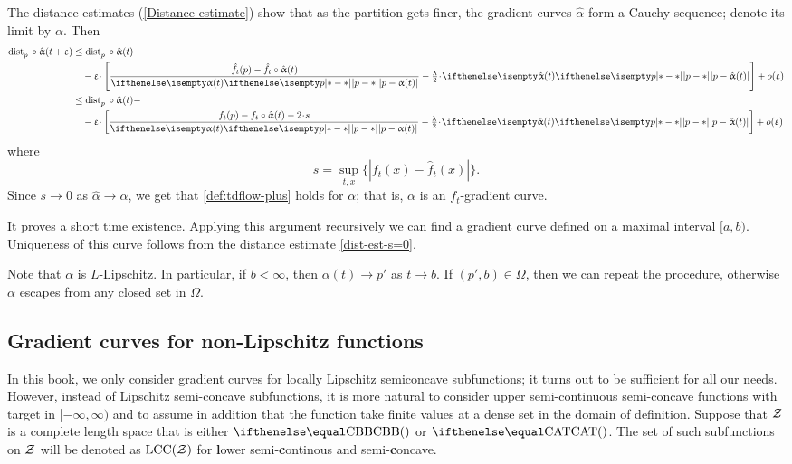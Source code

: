 The distance estimates (\ref{Distance estimate}) show that as the partition gets finer, the gradient curves $\hat\alpha$ form a Cauchy sequence; denote its limit by $\alpha$.
Then
\begin{align*}
\distfun{p}{}{}\circ\hat\alpha(t+\eps)
&\le 
\distfun{p}{}{}\circ\hat\alpha(t)-
\\
&\quad
-\eps\cdot \left[\frac{\hat f_t(p)-\hat f_t\circ\hat\alpha(t)}{\dist{p}{\alpha(t)}{}}-\tfrac\lambda2\cdot \dist{p}{\hat\alpha(t)}{}\right]
+o(\eps)
\\
&\le 
\distfun{p}{}{}\circ\hat\alpha(t)-
\\
&\quad
-\eps\cdot \left[\frac{f_t(p)-f_t\circ\hat\alpha(t)-2\cdot s}{\dist{p}{\alpha(t)}{}}-\tfrac\lambda2\cdot \dist{p}{\hat\alpha(t)}{}\right]
+o(\eps)
\end{align*}
where 
\[s=\sup_{t,x} \{|f_t(x)-\hat f_t(x)|\}.\]
Since $s\to 0$ as $\hat\alpha\to \alpha$, we get that \ref{def:tdflow-plus} holds for $\alpha$;
that is, $\alpha$ is an $f_t$-gradient curve.

It proves a short time existence.
Applying this argument recursively we can find a gradient curve defined on a maximal interval $[a,b)$.
Uniqueness of this curve follows from the distance estimate \ref{dist-est-s=0}. 

Note that $\alpha$ is $L$-Lipschitz.
In particular, if $b<\infty$, then $\alpha(t)\to p'$ as $t\to b$.
If $(p',b)\in \Omega$, then we can repeat the procedure, otherwise $\alpha$ escapes from any closed set in $\Omega$. 
\qeds

\subsection*{Gradient curves for non-Lipschitz functions}\label{sec:non-lip}

\def\LSCSC{\mathrm{LCC}}%
\def\Wasserstein{\mathrm{P}_2}

In this book, we only consider gradient curves for locally Lipschitz semiconcave subfunctions;
it turns out to be sufficient for all our needs.
However, 
instead of Lipschitz semi-concave subfunctions,
it is more natural to consider upper semi-continuous semi-concave functions
with target in $[-\infty,\infty)$
and to assume in addition that 
the function take finite values at a dense set in the domain of definition.
Suppose that $\mathcal{Z}$ is a complete length space that is either $\Alex{}$ or $\CAT{}$.
The set of such subfunctions on $\mathcal{Z}$ will be denoted as 
$\LSCSC(\spc{Z})$ for \textbf{l}ower semi-\textbf{c}ontinous and semi-\textbf{c}oncave.


